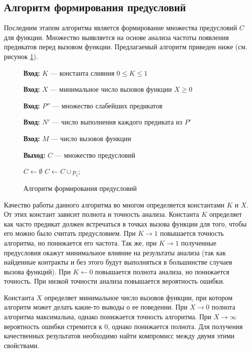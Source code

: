 \subsection{Алгоритм формирования предусловий}
Последним этапом алгоритма является формирование множества предусловий $C$ для функции. Множество выявляется на основе анализа частоты появления предикатов перед вызовом функции. Предлагаемый
алгоритм приведен ниже (см. рисунок \ref{image:extractionAlgoritm}).
\begin{figure}[h!]
\textbf{Вход:} $K$ --- константа слияния $0 \le K \le 1$

\textbf{Вход:} $X$ --- минимальное число вызовов функции $X \ge 0$

\textbf{Вход:} $P''$ --- множество слабейших предикатов

\textbf{Вход:} $N'$ --- число выполнения каждого предиката из $P'$

\textbf{Вход:} $M$ --- число вызовов функции

\textbf{Выход:} $C$ --- множество предусловий
\begin{algorithmic}[1]
\State $C \leftarrow \emptyset$
	\State \Return
\EndIf
{}
	\State $C \gets C \cup p_i$;
    \EndIf
\EndFor
\end{algorithmic}
\caption{Алгоритм формирования предусловий}
\label{image:extractionAlgoritm}
\end{figure}

Качество работы данного алгоритма во многом определяется константами $K$ и $X$. От этих констант зависит полнота и точность анализа. Константа $K$ определяет как часто предикат должен встречаться в точках вызова функции для того, чтобы его можно было считать предусловием. При $K \to 1$ повышается точность алгоритма, но понижается его частота. Так же, при $K \to 1$ полученные предусловия окажут минимальное влияние на результаты анализа (так как найденные контракты и без этого будут выполняться в большинстве случаев вызова функций). При $K \leftarrow 0$ повышается полнота анализа, но понижается точность. При низкой точности анализа повышается вероятность ошибки. 

Константа $X$ определяет минимальное число вызовов функции, при котором алгоритм может делать какие-то выводы о ее поведении. При $X \to 0$ полнота алгоритма максимальна, однако  понижается точность алгоритма. При $X \to \infty$ вероятность ошибки стремится к 0, однако понижается полнота. Для получения качественных результатов необходимо найти компромисс между двумя этими свойствами.

